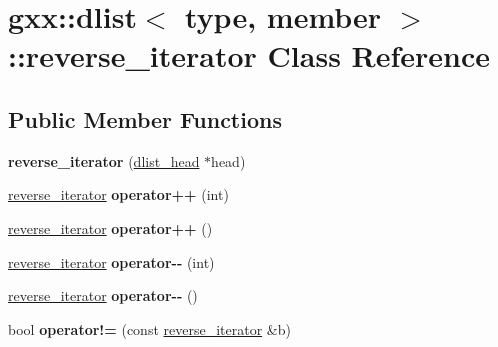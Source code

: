 \hypertarget{classgxx_1_1dlist_1_1reverse__iterator}{}\section{gxx\+:\+:dlist$<$ type, member $>$\+:\+:reverse\+\_\+iterator Class Reference}
\label{classgxx_1_1dlist_1_1reverse__iterator}
\subsection*{Public Member Functions}
\begin{DoxyCompactItemize}
\item 
{\bfseries reverse\+\_\+iterator} (\hyperlink{structdlist__head}{dlist\+\_\+head} $\ast$head)\hypertarget{classgxx_1_1dlist_1_1reverse__iterator_a46de23b1e7e37747316b1575d1298313}{}\label{classgxx_1_1dlist_1_1reverse__iterator_a46de23b1e7e37747316b1575d1298313}

\item 
\hyperlink{classgxx_1_1dlist_1_1reverse__iterator}{reverse\+\_\+iterator} {\bfseries operator++} (int)\hypertarget{classgxx_1_1dlist_1_1reverse__iterator_a83e357ef5bf6d98115192b8c8bda7a90}{}\label{classgxx_1_1dlist_1_1reverse__iterator_a83e357ef5bf6d98115192b8c8bda7a90}

\item 
\hyperlink{classgxx_1_1dlist_1_1reverse__iterator}{reverse\+\_\+iterator} {\bfseries operator++} ()\hypertarget{classgxx_1_1dlist_1_1reverse__iterator_a420133ea77f2bc8a26ea742d920ca024}{}\label{classgxx_1_1dlist_1_1reverse__iterator_a420133ea77f2bc8a26ea742d920ca024}

\item 
\hyperlink{classgxx_1_1dlist_1_1reverse__iterator}{reverse\+\_\+iterator} {\bfseries operator-\/-\/} (int)\hypertarget{classgxx_1_1dlist_1_1reverse__iterator_a3d15c6869711c29d743b199a6330fc7b}{}\label{classgxx_1_1dlist_1_1reverse__iterator_a3d15c6869711c29d743b199a6330fc7b}

\item 
\hyperlink{classgxx_1_1dlist_1_1reverse__iterator}{reverse\+\_\+iterator} {\bfseries operator-\/-\/} ()\hypertarget{classgxx_1_1dlist_1_1reverse__iterator_a7c5ddf1f328d584cfd2f29a5e2a81912}{}\label{classgxx_1_1dlist_1_1reverse__iterator_a7c5ddf1f328d584cfd2f29a5e2a81912}

\item 
bool {\bfseries operator!=} (const \hyperlink{classgxx_1_1dlist_1_1reverse__iterator}{reverse\+\_\+iterator} \&b)\hypertarget{classgxx_1_1dlist_1_1reverse__iterator_a25f65fbd55d11ffa18465395f202d886}{}\label{classgxx_1_1dlist_1_1reverse__iterator_a25f65fbd55d11ffa18465395f202d886}


\end{DoxyCompactItemize}
